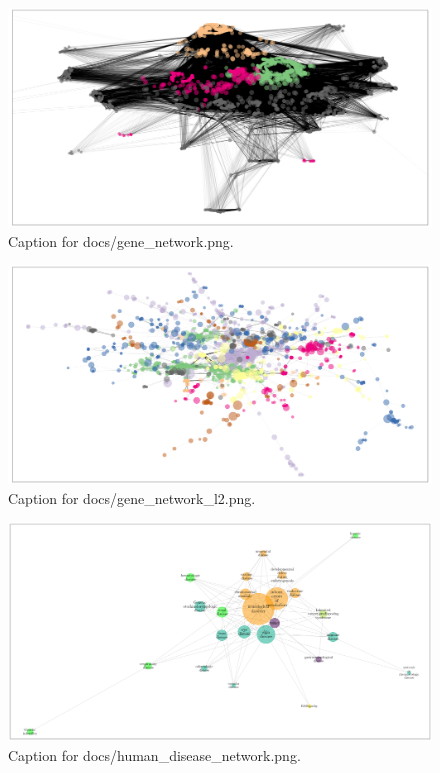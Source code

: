 \documentclass{article}
\begin{document}
\begin{figure}[h] \centering \includegraphics{docs/gene_network.png} \caption{Caption for docs/gene_network.png.} \end{figure}
\begin{figure}[h] \centering \includegraphics{docs/gene_network_l2.png} \caption{Caption for docs/gene_network_l2.png.} \end{figure}
\begin{figure}[h] \centering \includegraphics{docs/human_disease_network.png} \caption{Caption for docs/human_disease_network.png.} \end{figure}
\end{document}

